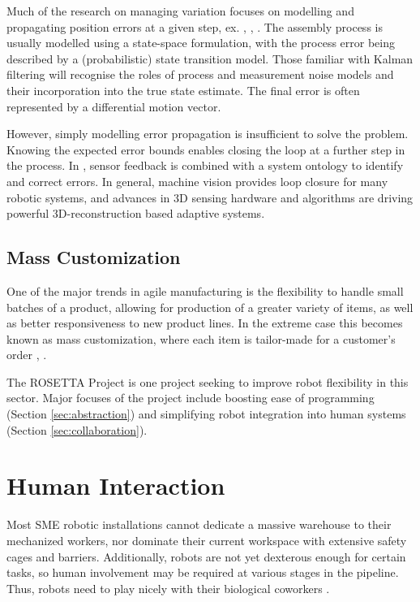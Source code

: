 Much of the research on managing variation focuses on modelling and propagating position errors at a given step, ex.
\cite{Mantripragada1999},
\cite{Zhou2003},
\cite{Liu2010a}.
The assembly process is usually modelled using a state-space formulation, with the process error being described by a (probabilistic) state transition model. Those familiar with Kalman filtering will recognise the roles of process and measurement noise models and their incorporation into the true state estimate. The final error is often represented by a differential motion vector.

However, simply modelling error propagation is insufficient to solve the problem. Knowing the expected error bounds enables closing the loop at a further step in the process. In
\cite{Balakirsky2013},
sensor feedback is combined with a system ontology to identify and correct errors. In general, machine vision provides loop closure for many robotic systems, and advances in 3D sensing hardware and algorithms are driving powerful 3D-reconstruction based adaptive systems.

\subsection{Mass Customization}
One of the major trends in agile manufacturing is the flexibility to handle small batches of a product, allowing for production of a greater variety of items, as well as better responsiveness to new product lines. In the extreme case this becomes known as mass customization, where each item is tailor-made for a customer's order
\cite{Piller2004},
\cite{Fogliatto2012}.

The ROSETTA Project
\cite{Patel2012}
is one project seeking to improve robot flexibility in this sector. Major focuses of the project include boosting ease of programming (Section \ref{sec:abstraction}) and simplifying robot integration into human systems (Section \ref{sec:collaboration}).

\pagebreak
\section{Human Interaction}
\label{sec:humans}
Most SME robotic installations cannot dedicate a massive warehouse to their mechanized workers, nor dominate their current workspace with extensive safety cages and barriers. Additionally, robots are not yet dexterous enough for certain tasks, so human involvement may be required at various stages in the pipeline. Thus, robots need to play nicely with their biological coworkers
\cite{Dong2011}.

